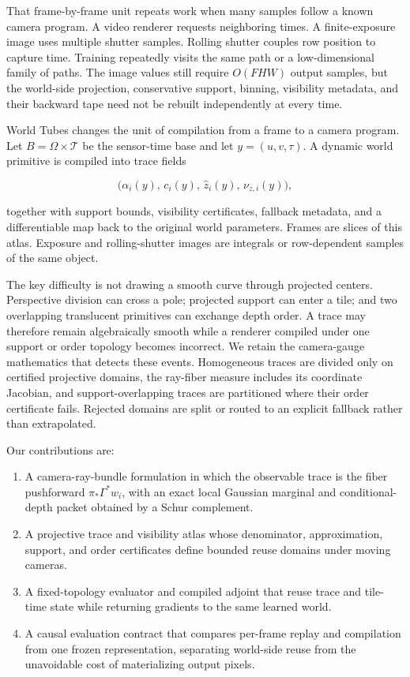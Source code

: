\documentclass[
]{article}
\providecommand{\tightlist}{%
  \setlength{\itemsep}{0pt}\setlength{\parskip}{0pt}}
\begin{document}
That frame-by-frame unit repeats work when many samples follow a known
camera program. A video renderer requests neighboring times. A
finite-exposure image uses multiple shutter samples. Rolling shutter
couples row position to capture time. Training repeatedly visits the
same path or a low-dimensional family of paths. The image values still
require \(O(FHW)\) output samples, but the world-side projection,
conservative support, binning, visibility metadata, and their backward
tape need not be rebuilt independently at every time.

World Tubes changes the unit of compilation from a frame to a camera
program. Let \(B=\Omega\times\mathcal T\) be the sensor-time base and
let \(y=(u,v,\tau)\). A dynamic world primitive is compiled into trace
fields

\[
  \bigl(\alpha_i(y),\,c_i(y),\,\widehat z_i(y),\,\nu_{z,i}(y)\bigr),
\]

together with support bounds, visibility certificates, fallback
metadata, and a differentiable map back to the original world
parameters. Frames are slices of this atlas. Exposure and
rolling-shutter images are integrals or row-dependent samples of the
same object.

The key difficulty is not drawing a smooth curve through projected
centers. Perspective division can cross a pole; projected support can
enter a tile; and two overlapping translucent primitives can exchange
depth order. A trace may therefore remain algebraically smooth while a
renderer compiled under one support or order topology becomes incorrect.
We retain the camera-gauge mathematics that detects these events.
Homogeneous traces are divided only on certified projective domains, the
ray-fiber measure includes its coordinate Jacobian, and
support-overlapping traces are partitioned where their order certificate
fails. Rejected domains are split or routed to an explicit fallback
rather than extrapolated.

Our contributions are:

\begin{enumerate}
\def\labelenumi{\arabic{enumi}.}
\tightlist
\item
  A camera-ray-bundle formulation in which the observable trace is the
  fiber pushforward \(\pi_*\Gamma^*w_i\), with an exact local Gaussian
  marginal and conditional-depth packet obtained by a Schur complement.
\item
  A projective trace and visibility atlas whose denominator,
  approximation, support, and order certificates define bounded reuse
  domains under moving cameras.
\item
  A fixed-topology evaluator and compiled adjoint that reuse trace and
  tile-time state while returning gradients to the same learned world.
\item
  A causal evaluation contract that compares per-frame replay and
  compilation from one frozen representation, separating world-side
  reuse from the unavoidable cost of materializing output pixels.
\end{enumerate}
\end{document}
